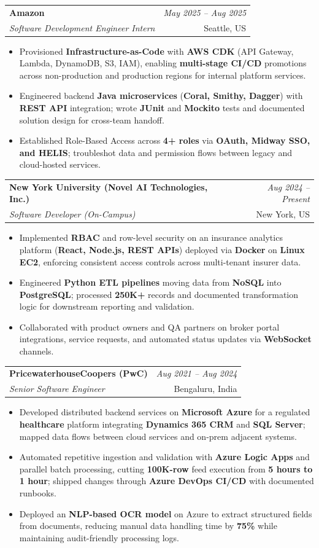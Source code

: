\documentclass[a4paper,10pt]{article}
\makeatletter
\newcommand{\resumeSubheading}[4]{
\vspace{0.3mm}\item
    \begin{tabular*}{0.98\textwidth}[t]{l@{\extracolsep{\fill}}r}
        \textbf{#1} & \textit{\footnotesize{#4}} \\
        \textit{\footnotesize{#3}} & \footnotesize{#2}\\
    \end{tabular*}\vspace{-2mm}
}
\newcommand{\resumeItemListStart}{\begin{itemize}[leftmargin=*, labelsep=1mm, itemsep=0pt]}
\newcommand{\resumeItemListEnd}{\end{itemize}\vspace{-2mm}}
\makeatother
\begin{document}
\resumeSubheading
{Amazon}{Seattle, US}
{Software Development Engineer Intern}{May 2025 -- Aug 2025}
\resumeItemListStart
\item \footnotesize{Provisioned \textbf{Infrastructure-as-Code} with \textbf{AWS CDK} (API Gateway, Lambda, DynamoDB, S3, IAM), enabling \textbf{multi-stage CI/CD} promotions across non-production and production regions for internal platform services.}
\item \footnotesize{Engineered backend \textbf{Java microservices} (\textbf{Coral, Smithy, Dagger}) with \textbf{REST API} integration; wrote \textbf{JUnit} and \textbf{Mockito} tests and documented solution design for cross-team handoff.}
\item \footnotesize{Established Role-Based Access across \textbf{4+ roles} via \textbf{OAuth, Midway SSO, and HELIS}; troubleshot data and permission flows between legacy and cloud-hosted services.}
\resumeItemListEnd

\resumeSubheading
{New York University (Novel AI Technologies, Inc.)}{New York, US}
{Software Developer (On-Campus)}{Aug 2024 -- Present}
\resumeItemListStart
\item \footnotesize{Implemented \textbf{RBAC} and row-level security on an insurance analytics platform (\textbf{React, Node.js, REST APIs}) deployed via \textbf{Docker} on \textbf{Linux EC2}, enforcing consistent access controls across multi-tenant insurer data.}
\item \footnotesize{Engineered \textbf{Python ETL pipelines} moving data from \textbf{NoSQL} into \textbf{PostgreSQL}; processed \textbf{250K+} records and documented transformation logic for downstream reporting and validation.}
\item \footnotesize{Collaborated with product owners and QA partners on broker portal integrations, service requests, and automated status updates via \textbf{WebSocket} channels.}
\resumeItemListEnd

\resumeSubheading
{PricewaterhouseCoopers (PwC)}{Bengaluru, India}
{Senior Software Engineer}{Aug 2021 -- Aug 2024}
\resumeItemListStart
\item \footnotesize{Developed distributed backend services on \textbf{Microsoft Azure} for a regulated \textbf{healthcare} platform integrating \textbf{Dynamics 365 CRM} and \textbf{SQL Server}; mapped data flows between cloud services and on-prem adjacent systems.}
\item \footnotesize{Automated repetitive ingestion and validation with \textbf{Azure Logic Apps} and parallel batch processing, cutting \textbf{100K-row} feed execution from \textbf{5 hours to 1 hour}; shipped changes through \textbf{Azure DevOps CI/CD} with documented runbooks.}
\item \footnotesize{Deployed an \textbf{NLP-based OCR model} on Azure to extract structured fields from documents, reducing manual data handling time by \textbf{75\%} while maintaining audit-friendly processing logs.}
\resumeItemListEnd
\end{document}
